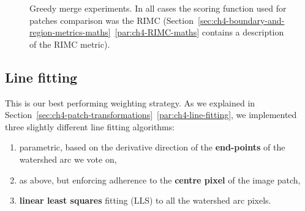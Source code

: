\begin{figure}[ht!]
\centering
\caption[Greedy merge experiments - plots]{Greedy merge experiments. In all cases the scoring function used for patches comparison was the RIMC (Section~\ref*{sec:ch4-boundary-and-region-metrics-maths}~\ref{par:ch4-RIMC-maths} contains a description of the RIMC metric).} %
\label{fig:segs-to-greedy-merge-RIMC}
\end{figure}

\subsection{Line fitting}
This is our best performing weighting strategy. As we explained in Section~\ref*{sec:ch4-patch-transformations}~\ref{par:ch4-line-fitting}, we implemented three slightly different line fitting algorithms:
\begin{enumerate}
  \item parametric, based on the derivative direction of the {\bf end-points} of the watershed arc we vote on,
  \item as above, but enforcing adherence to the {\bf centre pixel} of the image patch,
  \item {\bf linear least squares} fitting (LLS) to all the watershed arc pixels.
\end{enumerate}

